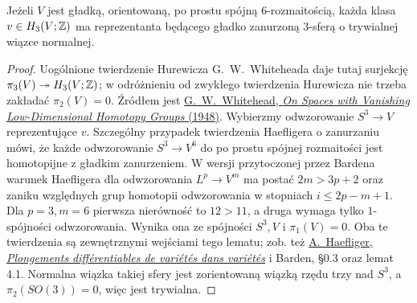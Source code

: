 \begin{lemat}
\label{lem:barden-sfera-24}
Jeżeli $V$ jest gładką, orientowaną,
po prostu spójną $6$-rozmaitością,
każda klasa $v\in H_3(V;\mathbb{Z})$ ma
reprezentanta będącego gładko
zanurzoną $3$-sferą o trywialnej
wiązce normalnej.
\end{lemat}
\begin{proof}
Uogólnione twierdzenie Hurewicza
G.~W.~Whiteheada daje tutaj
surjekcję $\pi_3(V)\twoheadrightarrow
H_3(V;\mathbb{Z})$; w odróżnieniu od zwykłego
twierdzenia Hurewicza nie trzeba
zakładać $\pi_2(V)=0$.
Źródłem jest
\href{https://doi.org/10.1073/pnas.34.5.207}
{G.\ W.\ Whitehead, \emph{On Spaces with
Vanishing Low-Dimensional Homotopy
Groups} (1948)}.
Wybierzmy odwzorowanie $S^3\to V$ reprezentujące
$v$. Szczególny przypadek twierdzenia
Haefligera o zanurzaniu mówi, że każde
odwzorowanie $S^3\to V^6$ do po prostu spójnej
rozmaitości jest homotopijne z gładkim
zanurzeniem. W wersji przytoczonej przez Bardena
warunek Haefligera dla odwzorowania $L^p\to V^m$
ma postać $2m>3p+2$ oraz zaniku względnych grup
homotopii odwzorowania w stopniach $i\leq2p-m+1$.
Dla $p=3,m=6$ pierwsza nierówność to $12>11$,
a druga wymaga tylko $1$-spójności odwzorowania.
Wynika ona ze spójności $S^3,V$ i $\pi_1(V)=0$.
Oba te twierdzenia są
zewnętrznymi wejściami tego lematu;
zob. też
\href{https://www.maths.ed.ac.uk/~v1ranick/papers/haeflig2.pdf}
{A.\ Haefliger, \emph{Plongements
différentiables de variétés dans variétés}}
i Barden, §0.3 oraz lemat 4.1.
Normalna wiązka takiej sfery jest
zorientowaną wiązką rzędu trzy nad
$S^3$, a $\pi_2(SO(3))=0$, więc jest
trywialna.
\end{proof}

